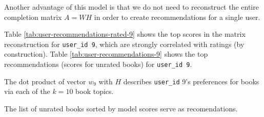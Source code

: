 \documentclass[11pt]{article}
\begin{document}
Another advantage of this model is that we do not need to reconstruct the entire completion matrix $A = WH$ in order to create recommendations for a single user.

Table \ref{tab:user-recommendations-rated-9} shows the top scores in the matrix reconstruction for \texttt{user\_id 9}, which are strongly correlated with ratings (by construction).
Table \ref{tab:user-recommendations-9} shows the top recommendations (scores for unrated books) for \texttt{user\_id 9}.



%
%  
%
%  
%  
%







\begin{table}[p]
\centering
  
  \caption[User Top Ratings]{The dot product of vector $w_9$ with $H$ describes \texttt{user\_id} 9's preferences for books via each of the $k=10$ book topics.}
  \label{tab:user-recommendations-rated-9}
\end{table}


\begin{table}[p]
\centering
  
  \caption[User Recommendations]{The list of unrated books sorted by model scores serve as recomendations.}
  \label{tab:user-recommendations-9}
\end{table}



    \clearpage
    

{}
    
    
\end{document}
